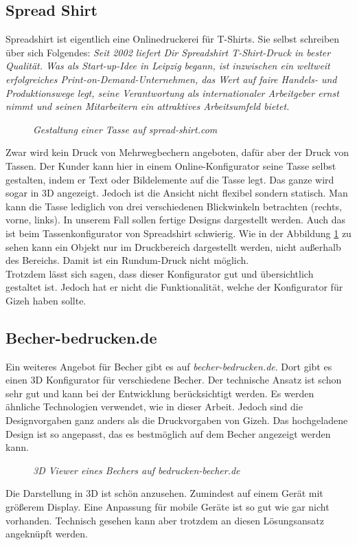 \subsection{Spread Shirt}
\label{sec:spreadshirt}
%
Spreadshirt ist eigentlich eine Onlinedruckerei für T-Shirts. Sie selbst schreiben über sich Folgendes: \textit{\glqq Seit 2002 liefert Dir Spreadshirt T-Shirt-Druck in bester Qualität. Was als Start-up-Idee in Leipzig begann, ist inzwischen ein weltweit erfolgreiches Print-on-Demand-Unternehmen, das Wert auf faire Handels- und Produktionswege legt, seine Verantwortung als internationaler Arbeitgeber ernst nimmt und seinen Mitarbeitern ein attraktives Arbeitsumfeld bietet.\grqq } \cite{spreadshirt_tassen_nodate}
%
\begin{figure}[h]
	\centering
	{}
	\caption[Tasse bestellen]{\textit{Gestaltung einer Tasse auf spread-shirt.com}}
	\label{fig:spread}
\end{figure}
%
Zwar wird kein Druck von Mehrwegbechern angeboten, dafür aber der Druck von Tassen. Der Kunder kann hier in einem Online-Konfigurator seine Tasse selbst gestalten, indem er Text oder Bildelemente auf die Tasse legt. Das ganze wird sogar in 3D angezeigt. Jedoch ist die Ansicht nicht flexibel sondern statisch. Man kann die Tasse lediglich von drei verschiedenen Blickwinkeln betrachten (rechts, vorne, links). In unserem Fall sollen fertige Designs dargestellt werden. Auch das ist beim Tassenkonfigurator von Spreadshirt schwierig. Wie in der Abbildung \ref{fig:spread} zu sehen kann ein Objekt nur im Druckbereich dargestellt werden, nicht außerhalb des Bereichs. Damit ist ein Rundum-Druck nicht möglich. \\
Trotzdem lässt sich sagen, dass dieser Konfigurator gut und übersichtlich gestaltet ist. Jedoch hat er nicht die Funktionalität, welche der Konfigurator für Gizeh haben sollte.
%
\subsection{Becher-bedrucken.de}
\label{sec:currycup}
%
Ein weiteres Angebot für Becher gibt es auf \textit{becher-bedrucken.de}. Dort gibt es einen 3D Konfigurator für verschiedene Becher. Der technische Ansatz ist schon sehr gut und kann bei der Entwicklung berücksichtigt werden. Es werden ähnliche Technologien verwendet, wie in dieser Arbeit. Jedoch sind die Designvorgaben ganz anders als die Druckvorgaben von Gizeh. Das hochgeladene Design ist so angepasst, das es bestmöglich auf dem Becher angezeigt werden kann.
%
\begin{figure}[h]
	\centering
	{}
	\caption[Becher bedrucken]{\textit{3D Viewer eines Bechers auf bedrucken-becher.de}}
	\label{fig:becherbedrucken}
\end{figure}
%
Die Darstellung in 3D ist schön anzusehen. Zumindest auf einem Gerät mit größerem Display. Eine Anpassung für mobile Geräte ist so gut wie gar nicht vorhanden. Technisch gesehen kann aber trotzdem an diesen Lösungsansatz angeknüpft werden.
%

